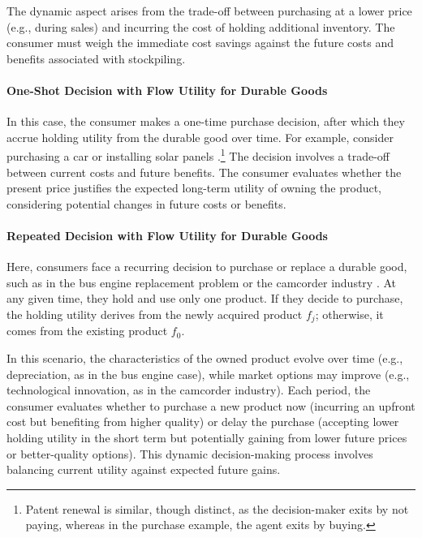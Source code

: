 \documentclass[12pt]{article}
\begin{document}
The dynamic aspect arises from the trade-off between purchasing at a lower
price (e.g., during sales) and incurring the cost of holding additional
inventory. The consumer must weigh the immediate cost savings against the
future costs and benefits associated with stockpiling.

\paragraph{One-Shot Decision with Flow Utility for Durable Goods}
In this case, the consumer makes a one-time purchase decision, after which they
accrue holding utility from the durable good over time. For example, consider
purchasing a car \citep{grigolon2018consumer} or installing solar panels
\citep{de2019subsidies}.\footnote{Patent renewal \citep{pakes1984patents} is
    similar, though distinct, as the decision-maker exits by not paying, whereas in
    the purchase example, the agent exits by buying.} The decision involves a
trade-off between current costs and future benefits. The consumer evaluates
whether the present price justifies the expected long-term utility of owning
the product, considering potential changes in future costs or benefits.

\paragraph{Repeated Decision with Flow Utility for Durable Goods}
Here, consumers face a recurring decision to purchase or replace a durable
good, such as in the bus engine replacement problem \citep{rust1987optimal} or
the camcorder industry \citep{gowrisankaran2012dynamics}. At any given time,
they hold and use only one product. If they decide to purchase, the holding
utility derives from the newly acquired product \(f_j\); otherwise, it comes
from the existing product \(f_0\).

In this scenario, the characteristics of the owned product evolve over time
(e.g., depreciation, as in the bus engine case), while market options may
improve (e.g., technological innovation, as in the camcorder industry). Each
period, the consumer evaluates whether to purchase a new product now (incurring
an upfront cost but benefiting from higher quality) or delay the purchase
(accepting lower holding utility in the short term but potentially gaining from
lower future prices or better-quality options). This dynamic decision-making
process involves balancing current utility against expected future gains.
\end{document}
